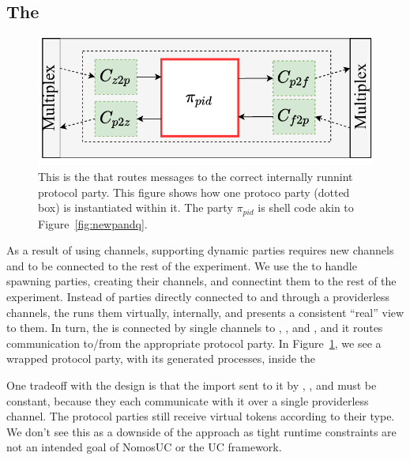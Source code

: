 \subsection{The \partywrapper}
\begin{figure}
	\centering
	\includegraphics[scale=0.5]{figures/singleshellmultiplex.pdf}
	\caption{This is the \partywrapper that routes messages to the correct internally runnint protocol party. This figure shows how one protoco party (dotted box) is instantiated within it. The party $\pi_{pid}$ is shell code akin to Figure~\ref{fig:newpandq}.}%
	\label{fig:singlemultiplex}
	\vspace{-3mm}
\end{figure}
As a result of using channels, supporting dynamic parties requires new channels and to be connected to the rest of the experiment.
We use the \partywrapper to handle spawning parties, creating their channels, and connectint them to the rest of the experiment.
Instead of parties directly connected to \F and \Z through a providerless channels, the \partywrapper runs them virtually, internally, and presents a consistent ``real'' view to them. 
In turn, the \partywrapper is connected by single channels to \F, \Z, and \A, and it routes communication to/from the appropriate protocol party. 
In Figure~\ref{fig:singlemultiplex}, we see a wrapped protocol party, with its generated processes, inside the \partywrapper 

One tradeoff with the \partywrapper design is that the import sent to it by \F, \Z, and \A must be constant, because they each communicate with it over a single providerless channel. The protocol parties still receive virtual tokens according to their type. 
We don't see this as a downside of the approach as tight runtime constraints are not an intended goal of NomosUC or the UC framework.

